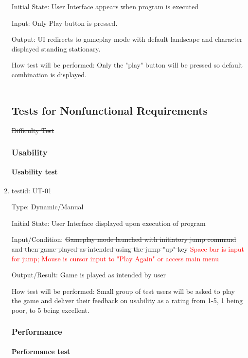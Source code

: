 \documentclass[12pt, titlepage]{article}
\begin{document}
\begin{enumerate}
Initial State: User Interface appears when program is executed
					
Input: Only Play button is pressed.
					
Output: UI redirects to gameplay mode with default landscape and character displayed standing stationary.
					
How test will be performed: Only the "play" button will be pressed so default combination is displayed.\\ \\



\subsection{Tests for Nonfunctional Requirements}
\sout{Difficulty Test}

\subsubsection{Usability}
		
\paragraph{Usability test}

\item{testid: UT-01\\}

Type: Dynamic/Manual
					
Initial State: User Interface displayed upon execution of program
					
Input/Condition: \sout{Gameplay mode launched with initiatory jump command and then game played as intended using the jump "up" key} \textcolor{red}{Space bar is input for jump; Mouse is cursor input to "Play Again" or access main menu}
					
Output/Result: Game is played as intended by user
					
How test will be performed:  Small group of test users will be asked to play the game and deliver their feedback on usability as a rating from 1-5, 1 being poor, to 5 being excellent.

\subsubsection{Performance}
		
\paragraph{Performance test}


\end{enumerate}
\end{document}

